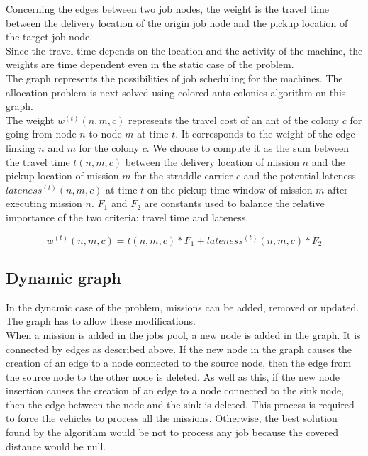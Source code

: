 \documentclass[a4paper,12pt]{article}
\begin{document}
Concerning the edges between two job nodes, the weight is the travel time between the delivery location of the origin job node and the pickup location of the target job node.\\

Since the travel time depends on the location and the activity of the machine, the weights are time dependent even in the static case of the problem.\\

The graph represents the possibilities of job scheduling for the machines. The allocation problem is next solved using colored ants colonies algorithm on this graph.\\

The weight $w^{(t)}(n,m,c)$ represents the travel cost of an ant of the colony $c$ for going from node $n$ to node $m$ at time $t$. It corresponds to the weight of the edge linking $n$ and $m$ for the colony $c$. We choose to compute it as the sum between the travel time $t(n,m,c)$ between the delivery location of mission $n$ and the pickup location of mission $m$ for the straddle carrier $c$ and the potential lateness $lateness^{(t)}(n,m,c)$ at time $t$ on the pickup time window of mission $m$ after executing mission $n$. $F_1$ and $F_2$ are constants used to balance the relative importance of the two criteria: travel time and lateness.

\begin{equation*}
  w^{(t)}(n,m,c) = t(n,m,c)*F_1 + lateness^{(t)}(n,m,c)*F_2
\end{equation*}

\subsection{Dynamic graph}
In the dynamic case of the problem, missions can be added, removed or updated. The graph has to allow these modifications.\\

When a mission is added in the jobs pool, a new node is added in the graph. It is connected by edges as described above. If the new node in the graph causes the creation of an edge to a node connected to the source node, then the edge from the source node to the other node is deleted. As well as this, if the new node insertion causes the creation of an edge to a node connected to the sink node, then the edge between the node and the sink is deleted. This process is required to force the vehicles to process all the missions. Otherwise, the best solution found by the algorithm would be not to process any job because the covered distance would be null.
\\
\end{document}
